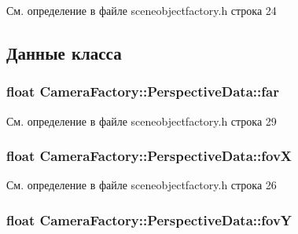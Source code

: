 См. определение в файле sceneobjectfactory.\+h строка 24



\subsection{Данные класса}
\subsubsection[{\texorpdfstring{far}{far}}]{\setlength{\rightskip}{0pt plus 5cm}float Camera\+Factory\+::\+Perspective\+Data\+::far}\hypertarget{struct_camera_factory_1_1_perspective_data_a7a69342f752826f9440482ddce959a2f}{}\label{struct_camera_factory_1_1_perspective_data_a7a69342f752826f9440482ddce959a2f}


См. определение в файле sceneobjectfactory.\+h строка 29

\subsubsection[{\texorpdfstring{fovX}{fovX}}]{\setlength{\rightskip}{0pt plus 5cm}float Camera\+Factory\+::\+Perspective\+Data\+::fovX}\hypertarget{struct_camera_factory_1_1_perspective_data_adad856561ffc92f96a2fe6a834f9baf0}{}\label{struct_camera_factory_1_1_perspective_data_adad856561ffc92f96a2fe6a834f9baf0}


См. определение в файле sceneobjectfactory.\+h строка 26

\subsubsection[{\texorpdfstring{fovY}{fovY}}]{\setlength{\rightskip}{0pt plus 5cm}float Camera\+Factory\+::\+Perspective\+Data\+::fovY}\hypertarget{struct_camera_factory_1_1_perspective_data_aee0e522e300405859de7ef8d32b63249}{}\label{struct_camera_factory_1_1_perspective_data_aee0e522e300405859de7ef8d32b63249}


